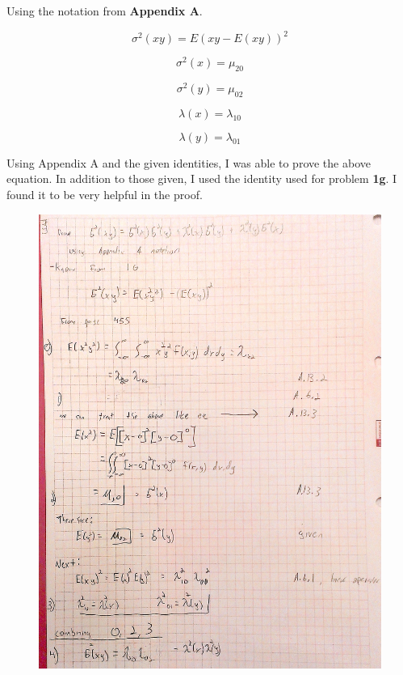 \documentclass[]{article}
\begin{document}
\noindent Using the notation from {\bf Appendix A}.


\begin{displaymath}
	\sigma^2(xy) = E(xy - E(xy))^2
\end{displaymath} 

\begin{displaymath}
	\sigma^2(x) = \mu_{20}
\end{displaymath}

\begin{displaymath}
	\sigma^2(y) = \mu_{02}
\end{displaymath}

\begin{displaymath}
	\lambda(x) = \lambda_{10}
\end{displaymath}

\begin{displaymath}
	\lambda(y) = \lambda_{01}
\end{displaymath}

\noindent \newline {}

\noindent	Using Appendix A and the given identities, I was able to prove the above equation. In addition to those given, I used the identity used for problem {\bf 1g}. I found it to be very helpful in the proof. 



\begin{figure}[hbtp]
	\noindent \includegraphics[scale=0.29]{Problem3Page1.jpg}
\end{figure}
\end{document}
